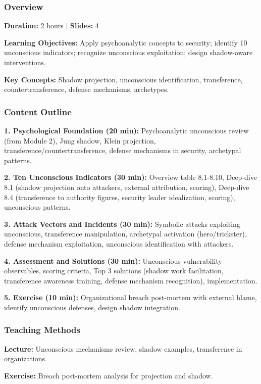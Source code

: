 \documentclass[11pt,a4paper]{article}
\begin{document}
\subsubsection{Overview}
\textbf{Duration:} 2 hours | \textbf{Slides:} 4

\textbf{Learning Objectives:} Apply psychoanalytic concepts to security; identify 10 unconscious indicators; recognize unconscious exploitation; design shadow-aware interventions.

\textbf{Key Concepts:} Shadow projection, unconscious identification, transference, countertransference, defense mechanisms, archetypes.

\subsubsection{Content Outline}
\textbf{1. Psychological Foundation (20 min):} Psychoanalytic unconscious review (from Module 2), Jung shadow, Klein projection, transference/countertransference, defense mechanisms in security, archetypal patterns.

\textbf{2. Ten Unconscious Indicators (30 min):} Overview table 8.1-8.10, Deep-dive 8.1 (shadow projection onto attackers, external attribution, scoring), Deep-dive 8.4 (transference to authority figures, security leader idealization, scoring), unconscious patterns.

\textbf{3. Attack Vectors and Incidents (30 min):} Symbolic attacks exploiting unconscious, transference manipulation, archetypal activation (hero/trickster), defense mechanism exploitation, unconscious identification with attackers.

\textbf{4. Assessment and Solutions (30 min):} Unconscious vulnerability observables, scoring criteria, Top 3 solutions (shadow work facilitation, transference awareness training, defense mechanism recognition), implementation.

\textbf{5. Exercise (10 min):} Organizational breach post-mortem with external blame, identify unconscious defenses, design shadow integration.

\subsubsection{Teaching Methods}
\textbf{Lecture:} Unconscious mechanisms review, shadow examples, transference in organizations.

\textbf{Exercise:} Breach post-mortem analysis for projection and shadow.
\end{document}
